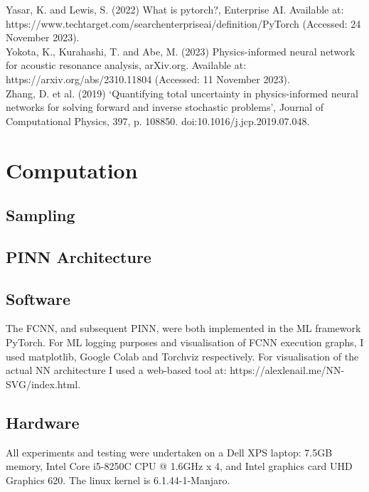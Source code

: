 \documentclass[12pt, openany]{book}
\begin{document}
Yasar, K. and Lewis, S. (2022) What is pytorch?, Enterprise AI. Available at: \\ https://www.techtarget.com/searchenterpriseai/definition/PyTorch (Accessed: 24 November 2023). \\

Yokota, K., Kurahashi, T. and Abe, M. (2023) Physics-informed neural network for acoustic resonance analysis, arXiv.org. Available at: https://arxiv.org/abs/2310.11804 (Accessed: 11 November 2023). \\

Zhang, D. et al. (2019) ‘Quantifying total uncertainty in physics-informed neural networks for solving forward and inverse stochastic problems’, Journal of Computational Physics, 397, p. 108850. doi:10.1016/j.jcp.2019.07.048.  \\


\chapter{Computation}

\section{Sampling}

\section{PINN Architecture}

\section{Software}

The FCNN, and subsequent PINN, were both implemented in the ML framework PyTorch. For ML logging purposes and visualisation of FCNN execution graphs, I used matplotlib, Google Colab and Torchviz respectively. For visualisation of the actual NN architecture I used a web-based tool at: https://alexlenail.me/NN-SVG/index.html.

\section{Hardware}

All experiments and testing were undertaken on a Dell XPS laptop: 7.5GB memory, Intel Core i5-8250C CPU @ 1.6GHz x 4, and Intel graphics card UHD Graphics 620. The linux kernel is 6.1.44-1-Manjaro.
\end{document}
